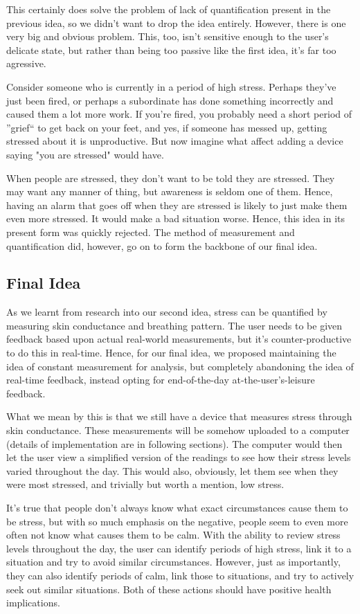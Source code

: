 \documentclass{scrartcl}
\begin{document}
This certainly does solve the problem of lack of quantification present in the previous idea, so we didn't want to drop
the idea entirely. However, there is one very big and obvious problem. This, too, isn't sensitive enough to the user's
delicate state, but rather than being too passive like the first idea, it's far too agressive.

Consider someone who is currently in a period of high stress. Perhaps they've just been fired, or perhaps a subordinate has
done something incorrectly and caused them a lot more work. If you're fired, you probably need a short period of ''grief``
to get back on your feet, and yes, if someone has messed up, getting stressed about it is unproductive. But now imagine what
affect adding a device saying "you are stressed" would have.

When people are stressed, they don't want to be told they are stressed. They may want any manner of thing, but awareness
is seldom one of them. Hence, having an alarm that goes off when they are stressed is likely to just make them even more
stressed. It would make a bad situation worse. Hence, this idea in its present form was quickly rejected. The method of
measurement and quantification did, however, go on to form the backbone of our final idea.

\subsection{Final Idea}

As we learnt from research into our second idea, stress can be quantified by measuring skin conductance and breathing pattern.
The user needs to be given feedback based upon actual real-world measurements, but it's counter-productive to do this in
real-time. Hence, for our final idea, we proposed maintaining the idea of constant measurement for analysis,
but completely abandoning the idea of real-time feedback, instead opting for end-of-the-day at-the-user's-leisure feedback.

What we mean by this is that we still have a device that measures stress through skin conductance.
These measurements will be somehow uploaded
to a computer (details of implementation are in following sections). The computer would then let the user view a simplified version
of the readings to see how their stress levels varied throughout the day. This would also, obviously, let them see when
they were most stressed, and trivially but worth a mention, low stress.

It's true that people don't always know what exact circumstances cause them to be stress, but with so much emphasis on the
negative, people seem to even more often not know what causes them to be calm. With the ability to review stress levels throughout
the day, the user can identify periods of high stress, link it to a situation and try to avoid similar circumstances. However,
just as importantly, they can also identify periods of calm, link those to situations, and try to actively seek out
similar situations. Both of these actions should have positive health implications.
\end{document}
